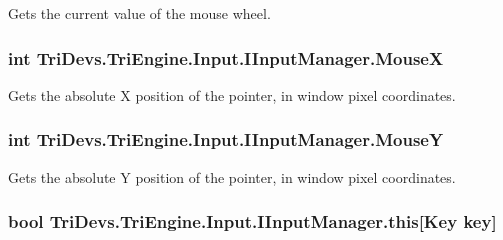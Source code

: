 Gets the current value of the mouse wheel. 

\hypertarget{interface_tri_devs_1_1_tri_engine_1_1_input_1_1_i_input_manager_a83c16b8ea4d95464abaafb187ce6dd48}{
\subsubsection[{Mouse\-X}]{\setlength{\rightskip}{0pt plus 5cm}int Tri\-Devs.\-Tri\-Engine.\-Input.\-I\-Input\-Manager.\-Mouse\-X\hspace{0.3cm}{\ttfamily [get]}}}\label{interface_tri_devs_1_1_tri_engine_1_1_input_1_1_i_input_manager_a83c16b8ea4d95464abaafb187ce6dd48}


Gets the absolute X position of the pointer, in window pixel coordinates. 

\hypertarget{interface_tri_devs_1_1_tri_engine_1_1_input_1_1_i_input_manager_abf34e14e3a3e440cbed57d231646113a}{
\subsubsection[{Mouse\-Y}]{\setlength{\rightskip}{0pt plus 5cm}int Tri\-Devs.\-Tri\-Engine.\-Input.\-I\-Input\-Manager.\-Mouse\-Y\hspace{0.3cm}{\ttfamily [get]}}}\label{interface_tri_devs_1_1_tri_engine_1_1_input_1_1_i_input_manager_abf34e14e3a3e440cbed57d231646113a}


Gets the absolute Y position of the pointer, in window pixel coordinates. 

\hypertarget{interface_tri_devs_1_1_tri_engine_1_1_input_1_1_i_input_manager_a254f095d63315114c7a8f41c4aac695e}{
\subsubsection[{this[Key key]}]{\setlength{\rightskip}{0pt plus 5cm}bool Tri\-Devs.\-Tri\-Engine.\-Input.\-I\-Input\-Manager.\-this\mbox{[}Key key\mbox{]}\hspace{0.3cm}{\ttfamily [get]}}}\label{interface_tri_devs_1_1_tri_engine_1_1_input_1_1_i_input_manager_a254f095d63315114c7a8f41c4aac695e}


